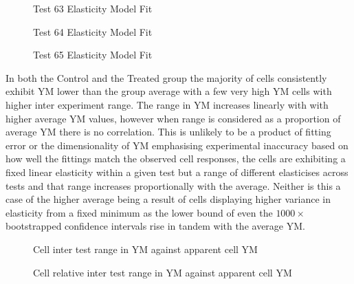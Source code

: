\documentclass[
  paper=a4,
  ,captions=tableheading
]{scrartcl}
\makeatletter
\newcommand*\pandocbounded[1]{%
  \sbox\pandoc@box{#1}%
  \Gscale@div\@tempa{\textheight}{\dimexpr\ht\pandoc@box+\dp\pandoc@box\relax}%
  \Gscale@div\@tempb{\linewidth}{\wd\pandoc@box}%
  \ifdim\@tempb\p@<\@tempa\p@\let\@tempa\@tempb\fi%
  \ifdim\@tempa\p@<\p@\scalebox{\@tempa}{\usebox\pandoc@box}%
  \else\usebox{\pandoc@box}%
  \fi%
}
\makeatother
\begin{document}
\noindent
\begin{minipage}[t]{0.32\textwidth}
\begin{figure}
\centering
\pandocbounded{}
\caption{Test 63 Elasticity Model Fit}
\end{figure}
\end{minipage}
\hfill
\begin{minipage}[t]{0.32\textwidth}
\begin{figure}
\centering
\pandocbounded{}
\caption{Test 64 Elasticity Model Fit}
\end{figure}
\end{minipage}
\hfill
\begin{minipage}[t]{0.32\textwidth}
\begin{figure}
\centering
\pandocbounded{}
\caption{Test 65 Elasticity Model Fit}
\end{figure}
\end{minipage}

In both the Control and the Treated group the majority of cells
consistently exhibit YM lower than the group average with a few very
high YM cells with higher inter experiment range. The range in YM
increases linearly with with higher average YM values, however when
range is considered as a proportion of average YM there is no
correlation. This is unlikely to be a product of fitting error or the
dimensionality of YM emphasising experimental inaccuracy based on how
well the fittings match the observed cell responses, the cells are
exhibiting a fixed linear elasticity within a given test but a range of
different elasticises across tests and that range increases
proportionally with the average. Neither is this a case of the higher
average being a result of cells displaying higher variance in elasticity
from a fixed minimum as the lower bound of even the \(1000\times\)
bootstrapped confidence intervals rise in tandem with the average YM.

\noindent
\begin{minipage}[t]{0.48\textwidth}
\begin{figure}
\centering
\pandocbounded{}
\caption{Cell inter test range in YM against apparent cell YM}
\end{figure}
\end{minipage}
\hfill
\begin{minipage}[t]{0.48\textwidth}
\begin{figure}
\centering
\pandocbounded{}
\caption{Cell relative inter test range in YM against apparent cell YM}
\end{figure}
\end{minipage}
\end{document}
